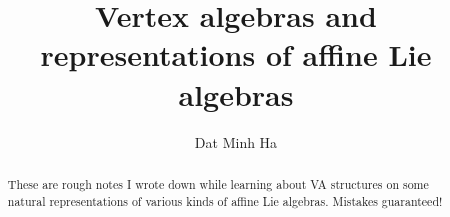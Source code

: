 

\setcounter{section}{-1}


\newcommand{\simpleroots}{\mathbb{I}}



    \title{Vertex algebras and representations of affine Lie algebras}
    
    \author{Dat Minh Ha}
    \maketitle
    
    \begin{abstract}
        These are rough notes I wrote down while learning about VA structures on some natural representations of various kinds of affine Lie algebras. Mistakes guaranteed!
    \end{abstract}
    
    {
    \hypersetup{} 
    \tableofcontents %
    }

    

    

    

    

    

    

    \begin{appendices}
        
    
        
    \end{appendices}
    
    \printbibliography

